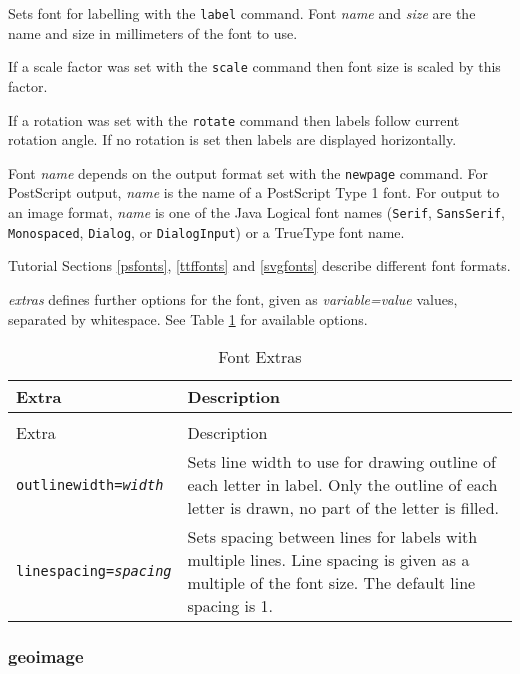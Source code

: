 Sets font for labelling with the \texttt{label} command.
Font \textit{name} and \textit{size} are the name and size in
millimeters of the font to use.

If a scale factor was set with the
\texttt{scale} command
then font size is scaled by this factor.

If a rotation was set with the
\texttt{rotate} command
then labels follow current rotation angle.
If no rotation is set then labels are displayed
horizontally.

Font \textit{name}
depends on the output format set with the
\texttt{newpage} command.
For PostScript output, \textit{name} is the name of a PostScript Type 1
font.
For output to an image format, \textit{name} is one of the Java Logical
font names (\texttt{Serif}, \texttt{SansSerif},
\texttt{Monospaced}, \texttt{Dialog}, or \texttt{DialogInput}) or a TrueType
font name.

Tutorial Sections \ref{psfonts}, \ref{ttffonts} and \ref{svgfonts}
describe different font formats.

\textit{extras} defines further options for the font, given as
\textit{variable=value} values, separated by whitespace.
See Table \ref{fontextras}
for available options.

\begin{longtable}{|l|p{7cm}|}
\hline
\label{fontextras}
Extra & Description \\
\hline
\hline
\endfirsthead
\hline
\caption{Font Extras} \\
\endfoot

\hline
Extra & Description \\
\hline
\hline
\endhead

\texttt{outlinewidth=\textit{width}} &

Sets line width to use for drawing outline of each letter in label.
Only the outline of each letter is drawn, no part of the letter is filled. \\

\texttt{linespacing=\textit{spacing}} &

Sets spacing between lines for labels with multiple lines.
Line spacing is given as a multiple of the font size.
The default line spacing is 1. \\

\hline
\end{longtable}

\subsubsection{geoimage}

